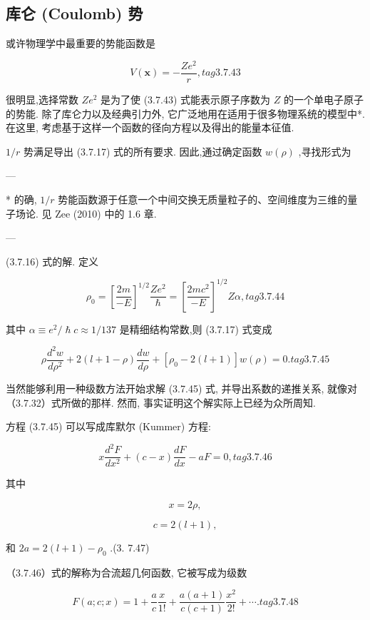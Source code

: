 \subsection{库仑 (Coulomb) 势}

或许物理学中最重要的势能函数是

$$
V\left( \mathbf{x}\right) = - \frac{Z{e}^{2}}{r}, tag{3. 7.43}
$$

很明显,选择常数 $Z{e}^{2}$ 是为了使 (3.7.43) 式能表示原子序数为 $Z$ 的一个单电子原子的势能. 除了库仑力以及经典引力外, 它广泛地用在适用于很多物理系统的模型中*. 在这里, 考虑基于这样一个函数的径向方程以及得出的能量本征值.

$1/r$ 势满足导出 (3.7.17) 式的所有要求. 因此,通过确定函数 $w\left( \rho \right)$ ,寻找形式为

---

* 的确, $1/r$ 势能函数源于任意一个中间交换无质量粒子的、空间维度为三维的量子场论. 见 Zee (2010) 中的 1.6 章.

---

(3.7.16) 式的解. 定义

$$
{\rho }_{0} = {\left\lbrack \frac{2m}{-E}\right\rbrack }^{1/2}\frac{Z{e}^{2}}{\hslash } = {\left\lbrack \frac{{2m}{c}^{2}}{-E}\right\rbrack }^{1/2}{Z\alpha }, tag{3. 7.44}
$$

其中 $\alpha \equiv {e}^{2}/\hslash c \approx 1/{137}$ 是精细结构常数,则 (3.7.17) 式变成

$$
\rho \frac{{d}^{2}w}{d{\rho }^{2}} + 2\left( {l + 1 - \rho }\right) \frac{dw}{d\rho } + \left\lbrack {{\rho }_{0} - 2\left( {l + 1}\right) }\right\rbrack w\left( \rho \right) = 0. tag{3. 7.45}
$$

当然能够利用一种级数方法开始求解 (3.7.45) 式, 并导出系数的递推关系, 就像对 （3.7.32）式所做的那样. 然而, 事实证明这个解实际上已经为众所周知.

方程 (3.7.45) 可以写成库默尔 (Kummer) 方程:

$$
x\frac{{d}^{2}F}{d{x}^{2}} + \left( {c - x}\right) \frac{dF}{dx} - {aF} = 0, tag{3. 7.46}
$$

其中

$$
x = {2\rho },
$$

$$
c = 2\left( {l + 1}\right) ,
$$

和 ${2a} = 2\left( {l + 1}\right) - {\rho }_{0}$ .(3. 7.47)

（3.7.46）式的解称为合流超几何函数, 它被写成为级数

$$
F\left( {a;c;x}\right) = 1 + \frac{a}{c}\frac{x}{1!} + \frac{a\left( {a + 1}\right) }{c\left( {c + 1}\right) }\frac{{x}^{2}}{2!} + \cdots . tag{3. 7.48}
$$

